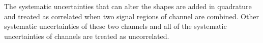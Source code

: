 \noindent The systematic uncertainties that can alter the shapes are added in quadrature and 
treated as correlated when two signal regions of \tauTau channel are combined. Other systematic uncertainties of these two 
channels and all of the systematic uncertainties of \leptonTau channels are treated as uncorrelated.


